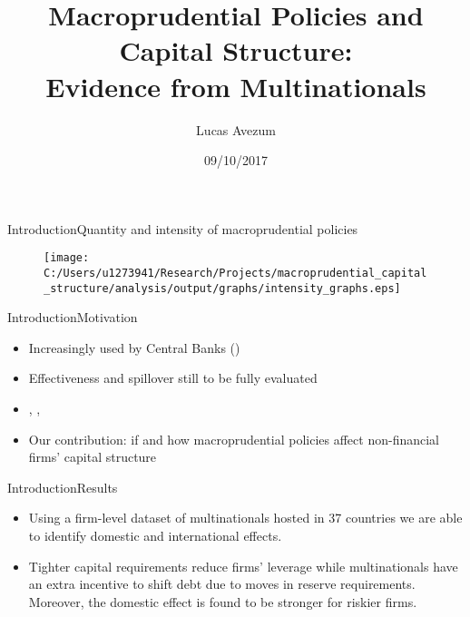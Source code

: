 \documentclass{beamer}
\title{Macroprudential Policies and Capital Structure: \\Evidence from Multinationals}
\author{Lucas Avezum}
\date{09/10/2017}
\begin{document}
	\begin{frame}
	\titlepage
\end{frame}

\begin{frame}{Introduction}{Quantity and intensity of macroprudential policies}

\begin{figure} [h!]
	\centering

	\texttt{[image: C:/Users/u1273941/Research/Projects/macroprudential\_capital\_structure/analysis/output/graphs/intensity\_graphs.eps]}
	
\end{figure}

\end{frame}

\begin{frame}{Introduction}{Motivation}
\begin{itemize}
	\item Increasingly used by Central Banks  (\cite*{NBERw22735})
	\item Effectiveness and spillover still to be fully evaluated
\item	\cite*{jimenez2012macroprudential}, 
	\cite*{aiyar2014does}
	 \cite*{buch2017cross}
	\cite*{ayyagari2017credit},
	\item Our contribution: if and how macroprudential policies affect non-financial firms' capital structure
		
\end{itemize}
\end{frame}

\begin{frame}{Introduction}{Results}
\begin{itemize}
	\item Using a firm-level dataset of multinationals hosted in 37 countries we are able to identify domestic and international effects.
	\item Tighter capital requirements reduce firms' leverage while multinationals have an extra incentive to shift debt due to moves in reserve requirements. Moreover, the domestic effect is found to be stronger for riskier firms.
\end{itemize}
\end{frame}
\end{document}
